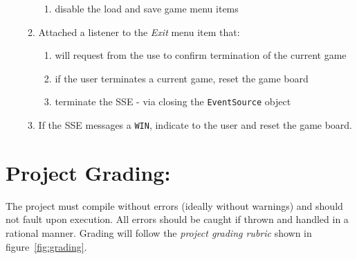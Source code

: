 \documentclass[10pt]{article}
\begin{document}
\begin{enumerate}
\begin{enumerate}
\begin{enumerate}
         \item disable the load and save game menu items
      \end{enumerate}
   
      \item Attached a listener to the \emph{Exit} menu item that:
      \begin{enumerate}
         \item will request from the use to confirm termination of the current game
         
         \item if the user terminates a current game, reset the game board
         
         \item terminate the SSE - via closing the \verb|EventSource| object
      \end{enumerate}
      
      \item If the SSE messages a \verb|WIN|, indicate to the user and reset the game board.
   \end{enumerate}
\end{enumerate}

\newpage
\section*{Project Grading:}

The project must compile without errors (ideally without warnings) and should not fault upon execution. All errors should be caught if thrown and handled in a rational manner. Grading will follow the \emph{project grading rubric} shown in figure~\ref{fig:grading}.
\end{document}
